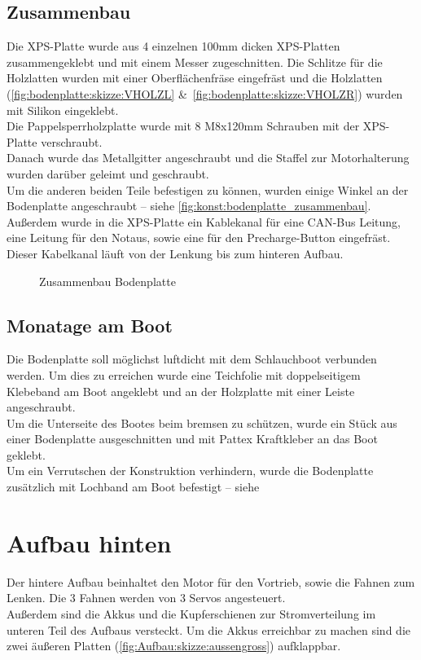 \subsection{Zusammenbau}
Die XPS-Platte wurde aus 4 einzelnen 100mm dicken XPS-Platten zusammengeklebt und mit einem Messer zugeschnitten. Die Schlitze für die Holzlatten wurden mit einer Oberflächenfräse eingefräst und die Holzlatten (\autoref{fig:bodenplatte:skizze:VHOLZL} \&\ \autoref{fig:bodenplatte:skizze:VHOLZR}) wurden mit Silikon eingeklebt.\\
Die Pappelsperrholzplatte wurde mit 8 M8x120mm Schrauben mit der XPS-Platte verschraubt.\\
Danach wurde das Metallgitter angeschraubt und die Staffel zur Motorhalterung wurden darüber geleimt und geschraubt.\\
Um die anderen beiden Teile befestigen zu können, wurden einige Winkel an der Bodenplatte angeschraubt -- siehe \autoref{fig:konst:bodenplatte_zusammenbau}.\\
Außerdem wurde in die XPS-Platte ein Kablekanal für eine CAN-Bus Leitung, eine Leitung für den Notaus, sowie eine für den Precharge-Button eingefräst. Dieser Kabelkanal läuft von der Lenkung bis zum hinteren Aufbau.
\begin{figure}[H]
    \caption{Zusammenbau Bodenplatte \label{fig:konst:bodenplatte_zusammenbau}}    
\end{figure}

\subsection{Monatage am Boot}
Die Bodenplatte soll möglichst luftdicht mit dem Schlauchboot verbunden werden. Um dies zu erreichen wurde eine Teichfolie mit doppelseitigem Klebeband am Boot angeklebt und an der Holzplatte mit einer Leiste angeschraubt.\\
Um die Unterseite des Bootes beim bremsen zu schützen, wurde ein Stück aus einer Bodenplatte ausgeschnitten und mit Pattex Kraftkleber an das Boot geklebt.\\
Um ein Verrutschen der Konstruktion verhindern, wurde die Bodenplatte zusätzlich mit Lochband am Boot befestigt -- siehe 


\clearpage
\section{Aufbau hinten}
Der hintere Aufbau beinhaltet den Motor für den Vortrieb, sowie die Fahnen zum Lenken. Die 3 Fahnen werden von 3 Servos angesteuert.\\ Außerdem sind die Akkus und die Kupferschienen zur Stromverteilung im unteren Teil des Aufbaus versteckt. Um die Akkus erreichbar zu machen sind die zwei äußeren Platten (\autoref{fig:Aufbau:skizze:aussengross}) aufklappbar.

